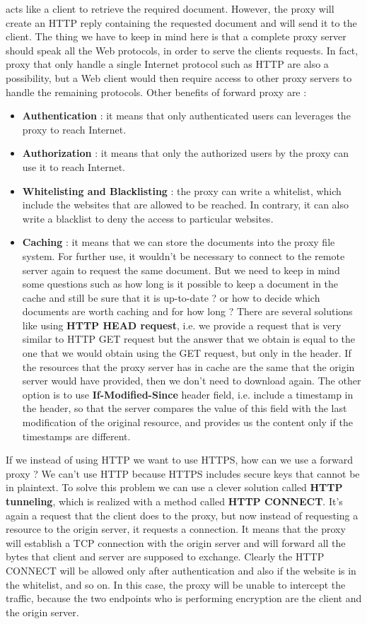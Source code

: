 \documentclass[11pt]{article}
\begin{document}
acts like a client to retrieve the required document. However, the proxy will create an HTTP reply containing the requested document and will send it to the client. The thing we have to keep in mind here is that a complete proxy server should speak all the Web protocols, in order to serve the clients requests. In fact, proxy that only handle a single Internet protocol such as HTTP are also a possibility, but a Web client would then require access to other proxy servers to handle the remaining protocols. Other benefits of forward proxy are : 
\begin{itemize}
\item \textbf{Authentication} : it means that only authenticated users can leverages the proxy to reach Internet.
\item \textbf{Authorization} : it means that only the authorized users by the proxy can use it to reach Internet.
\item \textbf{Whitelisting and Blacklisting} : the proxy can write a whitelist, which include the websites that are allowed to be reached. In contrary, it can also write a blacklist to deny the access to particular websites.
\item \textbf{Caching} : it means that we can store the documents into the proxy file system. For further use, it wouldn't be necessary to connect to the remote server again to request the same document. But we need to keep in mind some questions such as how long is it possible to keep a document in the cache and still be sure that it is up-to-date ? or how to decide which documents are worth caching and for how long ? There are several solutions like using \textbf{HTTP HEAD request}, i.e. we provide a request that is very similar to HTTP GET request but the answer that we obtain is equal to the one that we would obtain using the GET request, but only in the header. If the resources that the proxy server has in cache are the same that the origin server would have provided, then we don't need to download again. The other option is to use \textbf{If-Modified-Since} header field, i.e. include a timestamp in the header, so that the server compares the value of this field with the last modification of the original resource, and provides us the content only if the timestamps are different.
\end{itemize} 
If we instead of using HTTP we want to use HTTPS, how can we use a forward proxy ? We can't use HTTP because HTTPS includes secure keys that cannot be in plaintext. To solve this problem we can use a clever solution called \textbf{HTTP tunneling}, which is realized with a method called \textbf{HTTP CONNECT}. It's again a request that the client does to the proxy, but now instead of requesting a resource to the origin server, it requests a connection. It means that the proxy will establish a TCP connection with the origin server and will forward all the bytes that client and server are supposed to exchange. Clearly the HTTP CONNECT will be allowed only after authentication and also if the website is in the whitelist, and so on. In this case, the proxy will be unable to intercept the traffic, because the two endpoints who is performing encryption are the client and the origin server. 
\end{document}
